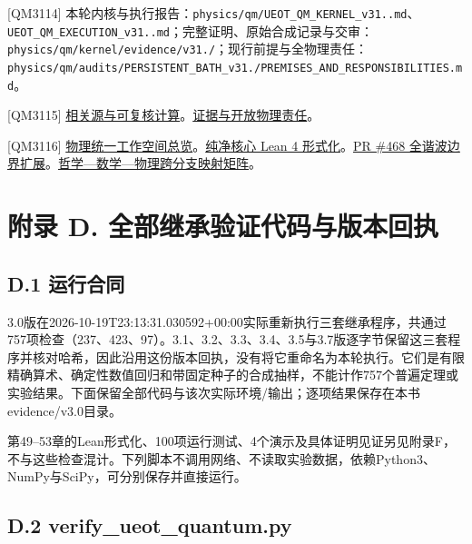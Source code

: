 \documentclass[
  11pt,
  oneside]{book}
\begin{document}
{[}QM3114{]}
本轮内核与执行报告：\texttt{physics/\allowbreak qm/\allowbreak UEOT\_\allowbreak QM\_\allowbreak KERNEL\_\allowbreak v31..\allowbreak md}、\allowbreak \texttt{UEOT\_\allowbreak QM\_\allowbreak EXECUTION\_\allowbreak v31..\allowbreak md}；完整证明、原始合成记录与交审：\texttt{physics/\allowbreak qm/\allowbreak kernel/\allowbreak evidence/\allowbreak v31./\allowbreak }；现行前提与全物理责任：\texttt{physics/\allowbreak qm/\allowbreak audits/\allowbreak PERSISTENT\_\allowbreak BATH\_\allowbreak v31./\allowbreak PREMISES\_\allowbreak AND\_\allowbreak RESPONSIBILITIES.\allowbreak md}。

{[}QM3115{]}
\href{../correlated_bath/README.md}{相关源与可复核计算}。\href{../ROADMAP.md}{证据与开放物理责任}。

{[}QM3116{]}
\href{../../unification/README.md}{物理统一工作空间总览}。\href{../../../formalization/ueot-physics-unification/README.md}{纯净核心
Lean 4
形式化}。\href{../null_source/timelike/finite_stress/lapse_boundary/all_harmonic_horizon/README.md}{PR
\#468
全谐波边界扩展}。\href{../../interfaces/PHILOSOPHY_MATHEMATICS_PHYSICS_UNIFICATION_MATRIX.md}{哲学---数学---物理跨分支映射矩阵}。

\chapter{附录 D. 全部继承验证代码与版本回执}\label{appendix-d}\hypertarget{appendix-d}{}

\section{D.1 运行合同}

3.0版在2026-10-19T23:13:31.030592+00:00实际重新执行三套继承程序，共通过757项检查（237、423、97）。3.1、3.2、3.3、3.4、3.5与3.7版逐字节保留这三套程序并核对哈希，因此沿用这份版本回执，没有将它重命名为本轮执行。它们是有限精确算术、确定性数值回归和带固定种子的合成抽样，不能计作757个普遍定理或实验结果。下面保留全部代码与该次实际环境/输出；逐项结果保存在本书evidence/v3.0目录。

第49--53章的Lean形式化、100项运行测试、4个演示及具体证明见证另见附录F，不与这些检查混计。下列脚本不调用网络、不读取实验数据，依赖Python3、NumPy与SciPy，可分别保存并直接运行。

\section{D.2 verify\_\allowbreak ueot\_\allowbreak quantum.py}
\end{document}
